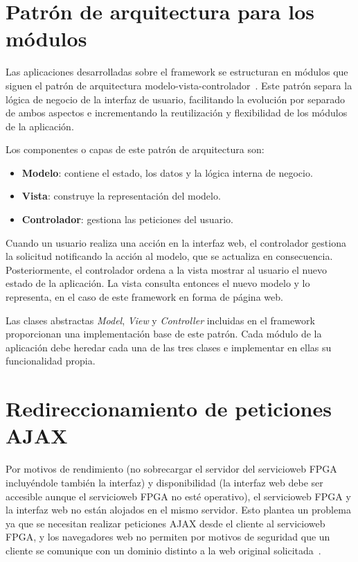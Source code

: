 \section{Patrón de arquitectura para los módulos\label{extra:mvc:mvc}}

Las aplicaciones desarrolladas sobre el \gls{framework} se estructuran en módulos que siguen el patrón de arquitectura modelo-vista-controlador~\cite{mvcpattern}.
Este patrón separa la lógica de negocio de la interfaz de usuario, facilitando la evolución por separado de ambos aspectos e incrementando la reutilización y flexibilidad de los módulos de la aplicación.

Los componentes o capas de este patrón de arquitectura son:
\begin{itemize}
  \item \textbf{Modelo}: contiene el estado, los datos y la lógica interna de negocio.
  \item \textbf{Vista}: construye la representación del modelo.
  \item \textbf{Controlador}: gestiona las peticiones del usuario.
\end{itemize}

Cuando un usuario realiza una acción en la interfaz web, el controlador gestiona la solicitud notificando la acción al modelo, que se actualiza en consecuencia.
Posteriormente, el controlador ordena a la vista mostrar al usuario el nuevo estado de la aplicación.
La vista consulta entonces el nuevo modelo y lo representa, en el caso de este \gls{framework} en forma de página web.

Las clases abstractas \textit{Model}, \textit{View} y \textit{Controller} incluidas en el \gls{framework} proporcionan una implementación base de este patrón.
Cada módulo de la aplicación debe heredar cada una de las tres clases e implementar en ellas su funcionalidad propia.


\section{Redireccionamiento de peticiones AJAX\label{extra:mvc:proxy}}

Por motivos de rendimiento (no sobrecargar el servidor del \gls{servicioweb} \gls{FPGA} incluyéndole también la interfaz) y disponibilidad (la interfaz web debe ser accesible aunque el \gls{servicioweb} \gls{FPGA} no esté operativo), el \gls{servicioweb} \gls{FPGA} y la interfaz web no están alojados en el mismo servidor.
Esto plantea un problema ya que se necesitan realizar peticiones \gls{AJAX} desde el cliente al \gls{servicioweb} \gls{FPGA}, y los navegadores web no permiten por motivos de seguridad que un cliente se comunique con un dominio distinto a la web original solicitada~\cite{sameorigin}.

